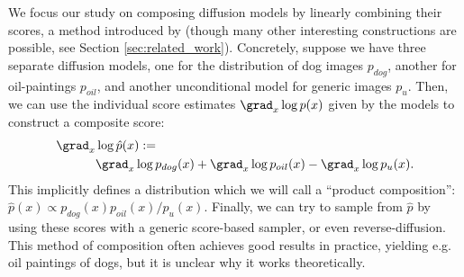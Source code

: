 We focus our study on
composing diffusion models by linearly combining their scores,
a method introduced by \citet{du2023reduce, liu2022compositional}
(though many other interesting constructions are possible, see Section \ref{sec:related_work}).
Concretely, suppose we have three separate diffusion models, one for the
distribution of dog images $p_{dog}$,
another for oil-paintings $p_{oil}$,
and another unconditional model for generic images $p_u$.
Then, we can use the individual score estimates $\grad_x \log p(x)$ 
given by the models to construct a composite score:
{\begin{align}
    \label{eq:intro-style-content}
    \grad_x &\log \hat p(x) := \\
    &\grad_x \log p_{dog}(x) + \grad_x \log p_{oil}(x) - \grad_x \log p_u(x).\notag
\end{align}
}%
This implicitly defines a distribution which we will call a ``product composition'':
$\hat{p}(x) \propto p_{dog}(x)p_{oil}(x)/p_u(x)$.
Finally, we can try to sample from $\hat{p}$
by using these scores with a generic score-based sampler,
or even reverse-diffusion.
This method of composition often achieves good results in practice,
yielding e.g. oil paintings of dogs,
but it is unclear why it works theoretically.


